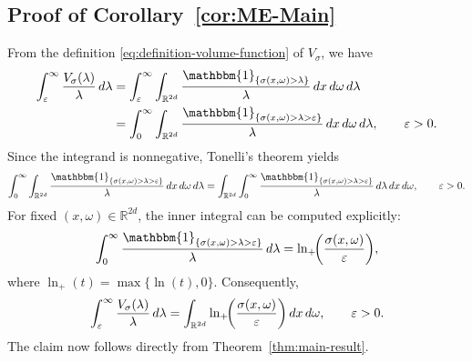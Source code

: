 \documentclass[a4paper,12pt]{article}
\let\originalleft\left
\let\originalright\right
\renewcommand{\left}{\mathopen{}\mathclose\bgroup\originalleft}
\renewcommand{\right}{\aftergroup\egroup\originalright}
\newcommand{\symbolnot}{\sigma}
\begin{document}
\subsection{Proof of Corollary~\ref{cor:ME-Main}}\label{sec:proof-ME-Main}

From the definition \eqref{eq:definition-volume-function} of $V_{\symbolnot}$, we have
\begin{align*}
\int_{\varepsilon}^{\infty}\frac{V_{\symbolnot}(\lambda)}{\lambda}\,d\lambda
&=
\int_{\varepsilon}^{\infty}
\int_{\mathbb{R}^{2d}}
\frac{\mathbbm{1}_{\{\symbolnot(x,\omega)>\lambda\}}}{\lambda}
\,dx\,d\omega\,d\lambda \\
&=
\int_{0}^{\infty}
\int_{\mathbb{R}^{2d}}
\frac{\mathbbm{1}_{\{\symbolnot(x,\omega)>\lambda>\varepsilon\}}}{\lambda}
\,dx\,d\omega\,d\lambda ,
\qquad \varepsilon>0.
\end{align*}
Since the integrand is nonnegative, Tonelli’s %
theorem yields
\[
\int_{0}^{\infty}
\int_{\mathbb{R}^{2d}}
\frac{\mathbbm{1}_{\{\symbolnot(x,\omega)>\lambda>\varepsilon\}}}{\lambda}
\,dx\,d\omega\,d\lambda
=
\int_{\mathbb{R}^{2d}}
\int_{0}^{\infty}
\frac{\mathbbm{1}_{\{\symbolnot(x,\omega)>\lambda>\varepsilon\}}}{\lambda}
\,d\lambda\,dx\,d\omega, \qquad \varepsilon>0.
\]
For fixed $(x,\omega)\in\mathbb{R}^{2d}$, the inner integral can be computed explicitly:
\[
\int_{0}^{\infty}
\frac{\mathbbm{1}_{\{\symbolnot(x,\omega)>\lambda>\varepsilon\}}}{\lambda}
\,d\lambda
=
\ln_{+}\!\left(\frac{\symbolnot(x,\omega)}{\varepsilon}\right),
\]
where $\ln_{+}(t)=\max\{\ln (t),0\}$.
Consequently,
\[
\int_{\varepsilon}^{\infty}\frac{V_{\symbolnot}(\lambda)}{\lambda}\,d\lambda
=
\int_{\mathbb{R}^{2d}}
\ln_{+}\!\left(\frac{\symbolnot(x,\omega)}{\varepsilon}\right)
\,dx\,d\omega ,
\qquad \varepsilon>0.
\]
The claim now follows directly from Theorem~\ref{thm:main-result}.


\end{document}
